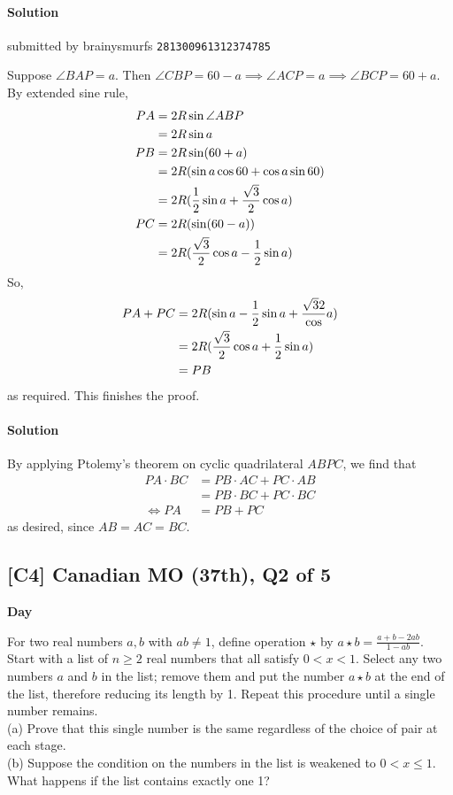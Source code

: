 \documentclass[10pt]{article}
\newcommand{\themonth}{March}
\newcommand{\theyear}{2019}
\newcounter{day}
\newcounter{solution}
\newcounter{datenumber}
\newcommand{\problem}[4][0]{
	\newpage
	\subsection{[#3] \space #2} \hfill 
	{\large\textbf{Day \arabic{day}}} %
	\begin{flushleft} #4 \end{flushleft}
	\vspace{1em}
	\addtocounter{day}{1}
	\addtocounter{datenumber}{1}
	\setcounter{solution}{1}
}
\newcommand{\solution}[4][0]{
	\paragraph{Solution \arabic{solution}} \hfill submitted by #2 \hfill \texttt{#3}
	\begin{flushleft} #4 \end{flushleft}
	\addtocounter{solution}{1}
	\vspace{1em}
}
\newcommand{\anonsolution}[2][0]{
	\paragraph{Solution \arabic{solution}} 
	\begin{flushleft} #2 \end{flushleft}
	\addtocounter{solution}{1}
	\vspace{1em}
}
\begin{document}
\solution[37]{brainysmurfs}{281300961312374785}{
Suppose $\angle BAP = a$. Then $\angle CBP = 60 - a \implies \angle ACP = a \implies \angle BCP = 60 + a$. \\
By extended sine rule, 
\begin{equation}
$$\begin{align*}
PA &= 2R \sin \angle ABP\\
&= 2R \sin a\\
PB &= 2R \sin (60 + a) \\
&= 2R (\sin a \cos 60 + \cos a \sin 60)\\
&= 2R(\frac{1}{2}\sin a + \frac{\sqrt{3}}{2}\cos a)\\
PC &= 2R(\sin(60 - a))\\
&= 2R(\frac{\sqrt{3}}{2} \cos a - \frac{1}{2}\sin a)
\end{align*}$$\end{equation}
So, 
\begin{equation}
$$\begin{align*}
PA+PC &= 2R(\sin a - \frac{1}{2} \sin a + \frac{\sqrt{3}{2}} \cos a)\\
&= 2R(\frac{\sqrt{3}}{2} \cos a + \frac{1}{2} \sin a)\\
&= PB \\
\end{align*}$$
\end{equation}
as required. This finishes the proof. 
}

\renewcommand{\themonth}{May}
\setcounter{datenumber}{1}

\anonsolution[37]{By applying Ptolemy's theorem on cyclic quadrilateral \(ABPC\), we find that \begin{align*} PA\cdot BC&= PB\cdot AC+PC\cdot AB \\ &= PB\cdot BC +PC\cdot BC \\ \iff PA&=PB+PC \end{align*} as desired, since \(AB=AC=BC\).}

\problem[38]{2007 Canadian MO (37th), Q2 of 5}{C4}{For two real numbers $a,b$ with $ab \neq 1$, define operation $\star$ by $a \star b = \frac{a + b - 2ab}{1 - ab}$. Start with a list of $n \geq 2$ real numbers that all satisfy $0 < x < 1$. Select any two numbers $a$ and $b$ in the list; remove them and put the number $a \star b$ at the end of the list, therefore reducing its length by 1. Repeat this procedure until a single number remains.\\
	(a) Prove that this single number is the same regardless of the choice of pair at each stage.\\
	(b) Suppose the condition on the numbers in the list is weakened to $0 < x \leq 1$. What happens if the list contains exactly one 1?}
\end{document}
